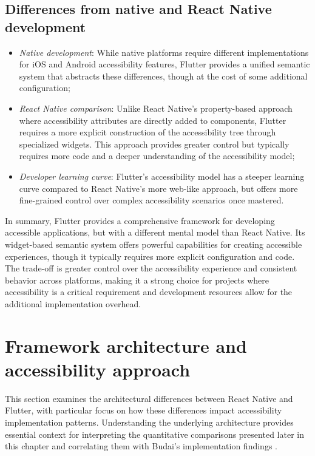 \subsection{Differences from native and React Native development}
\begin{itemize}
    \item \textit{Native development}: While native platforms require different implementations for iOS and Android accessibility features, Flutter provides a unified semantic system that abstracts these differences, though at the cost of some additional configuration;
    
    \item \textit{React Native comparison}: Unlike React Native's property-based approach where accessibility attributes are directly added to components, Flutter requires a more explicit construction of the accessibility tree through specialized widgets. This approach provides greater control but typically requires more code and a deeper understanding of the accessibility model;
    
    \item \textit{Developer learning curve}: Flutter's accessibility model has a steeper learning curve compared to React Native's more web-like approach, but offers more fine-grained control over complex accessibility scenarios once mastered.
\end{itemize}

In summary, Flutter provides a comprehensive framework for developing accessible applications, but with a different mental model than React Native. Its widget-based semantic system offers powerful capabilities for creating accessible experiences, though it typically requires more explicit configuration and code. The trade-off is greater control over the accessibility experience and consistent behavior across platforms, making it a strong choice for projects where accessibility is a critical requirement and development resources allow for the additional implementation overhead.

\section{Framework architecture and accessibility approach}
\label{sec:framework-architecture}

This section examines the architectural differences between React Native and Flutter, with particular focus on how these differences impact accessibility implementation patterns. Understanding the underlying architecture provides essential context for interpreting the quantitative comparisons presented later in this chapter and correlating them with Budai's implementation findings \cite{budai2024mobile}.

